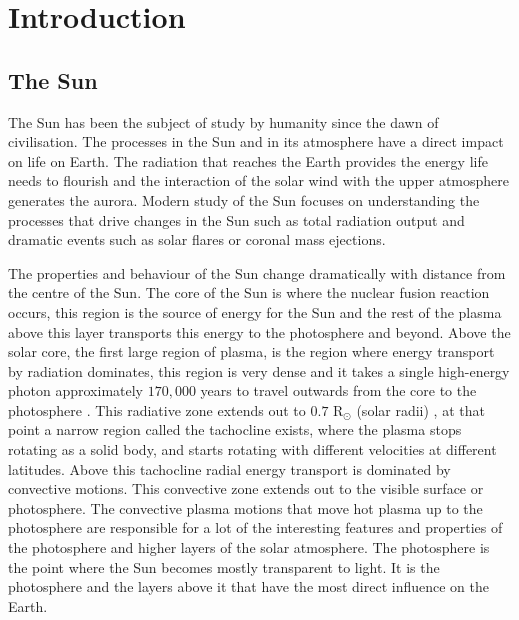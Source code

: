 \documentclass[a4paper,12pt,fourier,authoryear,custommargin]{Classes/PhDThesisPSnPDF}
\begin{document}
\chapter{Introduction}  %


\section{The Sun} %
The Sun has been the subject of study by humanity since the dawn of civilisation.
The processes in the Sun and in its atmosphere have a direct impact on life on Earth.
The radiation that reaches the Earth provides the energy life needs to flourish and the interaction of the solar wind with the upper atmosphere generates the aurora.
Modern study of the Sun focuses on understanding the processes that drive changes in the Sun such as total radiation output and dramatic events such as solar flares or coronal mass ejections.

The properties and behaviour of the Sun change dramatically with distance from the centre of the Sun.
The core of the Sun is where the nuclear fusion reaction occurs, this region is the source of energy for the Sun and the rest of the plasma above this layer transports this energy to the photosphere and beyond.
Above the solar core, the first large region of plasma, is the region where energy transport by radiation dominates, this region is very dense and it takes a single high-energy photon approximately $170,000$ years to travel outwards from the core to the photosphere \citep{priest2014}.
This radiative zone extends out to $0.7$ R$_\odot$ (solar radii) \citep{priest2014}, at that point a narrow region called the tachocline exists, where the plasma stops rotating as a solid body, and starts rotating with different velocities at different latitudes.
Above this tachocline radial energy transport is dominated by convective motions.
This convective zone extends out to the visible surface or photosphere.
The convective plasma motions that move hot plasma up to the photosphere are responsible for a lot of the interesting features and properties of the photosphere and higher layers of the solar atmosphere.
The photosphere is the point where the Sun becomes mostly transparent to light.
It is the photosphere and the layers above it that have the most direct influence on the Earth.
\end{document}
